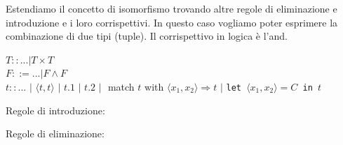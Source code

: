 \documentclass{article}
\begin{document}
\bigskip

Estendiamo il concetto di isomorfismo trovando altre regole di eliminazione e introduzione e i loro corrispettivi. In questo caso vogliamo poter esprimere la combinazione di due tipi (tuple). Il corrispettivo in logica è l'and.

\bigskip

\noindent $T:: ... | T\times T$ \\
$F ::= ... | F \land F$\\
$t:: ... \,\,|\,\, \langle t,t\rangle\,\, | \,\,t.1 \,\,|\,\, t.2 \,\,|\,\,$ match $t$ with $\langle x_1,x_2\rangle\Rightarrow t\,\,|\,\,$\verb|let |$\langle x_1,x_2\rangle = C$\verb| in |$t$
\bigskip

\noindent Regole di introduzione:

\bigskip

\begin{minipage}{0.49\textwidth}
\end{minipage}
{
\hspace{2em}
\begin{minipage}{0.49\textwidth}
\end{minipage}}

\bigskip

\noindent Regole di eliminazione:

\bigskip

\begin{minipage}{0.49\textwidth}
\end{minipage}
{
\hspace{2em}
\begin{minipage}{0.49\textwidth}
\end{minipage}}

\bigskip

\begin{minipage}{0.49\textwidth}
\end{minipage}
{
\hspace{2em}
\begin{minipage}{0.49\textwidth}
\end{minipage}}

\bigskip
\end{document}

